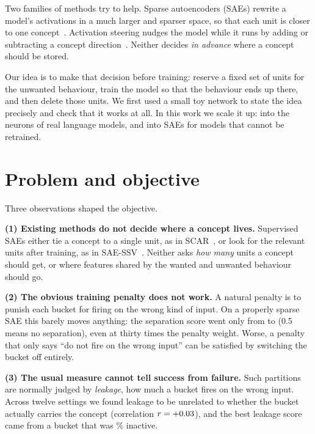 \documentclass[11pt,a4paper]{article}
\begin{document}
Two families of methods try to help. Sparse autoencoders (SAEs) rewrite a model's activations in a
much larger and sparser space, so that each unit is closer to one concept~\citep{bricken2023monosemanticity,cunningham2024sparse,gao2024scaling}.
Activation steering nudges the model while it runs by adding or subtracting a concept
direction~\citep{turner2023actadd,rimsky2024caa}. Neither decides \emph{in advance} where a concept
should be stored.

Our idea is to make that decision before training: reserve a fixed set of units for the unwanted
behaviour, train the model so that the behaviour ends up there, and then delete those units. We first
used a small toy network to state the idea precisely and check that it works at all. In this work we
scale it up: into the neurons of real language models, and into SAEs for models that cannot be
retrained.

\section{Problem and objective}

Three observations shaped the objective.

\textbf{(1) Existing methods do not decide where a concept lives.} Supervised SAEs either tie a
concept to a single unit, as in SCAR~\citep{harle2024scar}, or look for the relevant units after
training, as in SAE-SSV~\citep{he2025saessv}. Neither asks \emph{how many} units a concept should get,
or where features shared by the wanted and unwanted behaviour should go.

\textbf{(2) The obvious training penalty does not work.} A natural penalty is to punish each bucket
for firing on the wrong kind of input. On a properly sparse SAE this barely moves anything: the
separation score went only from \sqLeakLamZero{} to \sqLeakLamThirty{} (0.5 means no separation),
even at thirty times the penalty weight. Worse, a penalty that only says ``do not fire on the wrong
input'' can be satisfied by switching the bucket off entirely.

\textbf{(3) The usual measure cannot tell success from failure.} Such partitions are normally judged by
\emph{leakage}, how much a bucket fires on the wrong input. Across twelve settings we found leakage to
be unrelated to whether the bucket actually carries the concept (correlation $r=+0.03$),
and the best leakage score came from a bucket that was \bestLeakDeadPct\% inactive.
\end{document}
